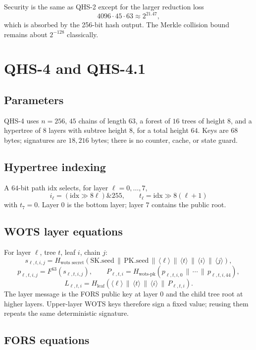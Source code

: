 \documentclass[11pt,a4paper]{article}
\theoremstyle{remark}
\newcommand{\concat}{\,\|\,}
\begin{document}
Security is the same as QHS-2 except for the larger reduction loss
\[
4096\cdot 45\cdot 63\approx 2^{21.47},
\]
which is absorbed by the 256-bit hash output. The Merkle collision bound remains
about \(2^{-128}\) classically.

\section{QHS-4 and QHS-4.1}

\subsection{Parameters}

QHS-4 uses \(n=256\), \(45\) chains of length \(63\), a forest of \(16\) trees
of height \(8\), and a hypertree of \(8\) layers with subtree height \(8\),
for a total height \(64\). Keys are \(68\) bytes; signatures are \(18{,}216\)
bytes; there is no counter, cache, or state guard.

\subsection{Hypertree indexing}

A \(64\)-bit path \(\mathrm{idx}\) selects, for layer \(\ell=0,\dots,7\),
\[
i_\ell=(\mathrm{idx}\gg 8\ell)\mathbin{\&}255,
\qquad
t_\ell=\mathrm{idx}\gg 8(\ell+1)
\]
with \(t_7=0\). Layer \(0\) is the bottom layer; layer \(7\) contains the public
root.

\subsection{WOTS layer equations}

For layer \(\ell\), tree \(t\), leaf \(i\), chain \(j\):
\[
s_{\ell,t,i,j}
=
H_{\text{wots secret}}
(\mathrm{SK.seed}\concat\mathrm{PK.seed}\concat\langle\ell\rangle
\concat\langle t\rangle\concat\langle i\rangle\concat\langle j\rangle),
\]
\[
p_{\ell,t,i,j}=F^{63}(s_{\ell,t,i,j}),
\qquad
P_{\ell,t,i}=H_{\text{wots-pk}}(p_{\ell,t,i,0}\concat\cdots\concat p_{\ell,t,i,44}),
\]
\[
L_{\ell,t,i}=H_{\text{leaf}}(\langle\ell\rangle\concat\langle t\rangle
\concat\langle i\rangle\concat P_{\ell,t,i}).
\]
The layer message is the FORS public key at layer \(0\) and the child tree root
at higher layers. Upper-layer WOTS keys therefore sign a fixed value; reusing
them repeats the same deterministic signature.

\subsection{FORS equations}
\end{document}
